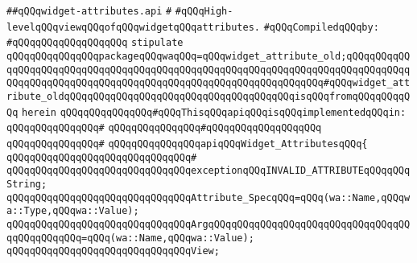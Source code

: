 \label{src/lib/x-kit/widget/old/basic/widget-attributes.api}
\verb|##qQQqwidget-attributes.api|\newline
\verb|#|\newline
\verb|#qQQqHigh-levelqQQqviewqQQqofqQQqwidgetqQQqattributes.|\newline
\newline
\verb|#qQQqCompiledqQQqby:|\newline
\verb|#qQQqqQQqqQQqqQQqqQQq|\newline
\newline
\newline
\verb|stipulate|\newline
\verb|qQQqqQQqqQQqqQQqpackageqQQqwaqQQq=qQQqwidget_attribute_old;qQQqqQQqqQQqqQQqqQQqqQQqqQQqqQQqqQQqqQQqqQQqqQQqqQQqqQQqqQQqqQQqqQQqqQQqqQQqqQQqqQQqqQQqqQQqqQQqqQQqqQQqqQQqqQQqqQQqqQQqqQQqqQQqqQQqqQQq#qQQqwidget_attribute_oldqQQqqQQqqQQqqQQqqQQqqQQqqQQqqQQqqQQqqQQqisqQQqfromqQQqqQQqqQQq|\newline
\verb|herein|\newline
\newline
\verb|qQQqqQQqqQQqqQQq#qQQqThisqQQqapiqQQqisqQQqimplementedqQQqin:|\newline
\verb|qQQqqQQqqQQqqQQq#|\newline
\verb|qQQqqQQqqQQqqQQq#qQQqqQQqqQQqqQQqqQQq|\newline
\verb|qQQqqQQqqQQqqQQq#|\newline
\verb|qQQqqQQqqQQqqQQqapiqQQqWidget_AttributesqQQq{|\newline
\verb|qQQqqQQqqQQqqQQqqQQqqQQqqQQqqQQq#|\newline
\verb|qQQqqQQqqQQqqQQqqQQqqQQqqQQqqQQqexceptionqQQqINVALID_ATTRIBUTEqQQqqQQqString;|\newline
\newline
\verb|qQQqqQQqqQQqqQQqqQQqqQQqqQQqqQQqAttribute_SpecqQQq=qQQq(wa::Name,qQQqwa::Type,qQQqwa::Value);|\newline
\verb|qQQqqQQqqQQqqQQqqQQqqQQqqQQqqQQqArgqQQqqQQqqQQqqQQqqQQqqQQqqQQqqQQqqQQqqQQqqQQqqQQq=qQQq(wa::Name,qQQqwa::Value);|\newline
\newline
\verb|qQQqqQQqqQQqqQQqqQQqqQQqqQQqqQQqView;|\newline
